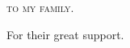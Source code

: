 \thispagestyle{empty}
    \null{}
        \begin{flushright}
            \textsc{to my family.}

            {\color{black!60}\textsf{%
                For their great support.}}
        \end{flushright}
\null
